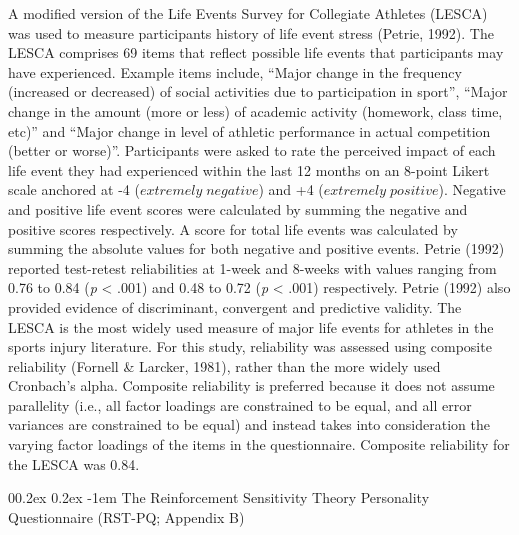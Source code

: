 \documentclass[
  english,
  man,floatsintext]{apa6}
\makeatletter
\renewcommand{\paragraph}{\@startsection{paragraph}{4}{\parindent}%
  {0\baselineskip \@plus 0.2ex \@minus 0.2ex}%
  {-1em}%
  {\normalfont\normalsize\bfseries\itshape\typesectitle}}
\makeatother
\begin{document}
A modified version of the Life Events Survey for Collegiate Athletes (LESCA) was used to measure participants history of life event stress (Petrie, 1992).
The LESCA comprises 69 items that reflect possible life events that participants may have experienced.
Example items include, \enquote{Major change in the frequency (increased or decreased) of social activities due to participation in sport}, \enquote{Major change in the amount (more or less) of academic activity (homework, class time, etc)} and \enquote{Major change in level of athletic performance in actual competition (better or worse)}.
Participants were asked to rate the perceived impact of each life event they had experienced within the last 12 months on an 8-point Likert scale anchored at -4 (\(extremely\;negative\)) and +4 (\(extremely\;positive\)).
Negative and positive life event scores were calculated by summing the negative and positive scores respectively.
A score for total life events was calculated by summing the absolute values for both negative and positive events.
Petrie (1992) reported test-retest reliabilities at 1-week and 8-weeks with values ranging from 0.76 to 0.84 (\emph{p} \textless{} .001) and 0.48 to 0.72 (\emph{p} \textless{} .001) respectively.
Petrie (1992) also provided evidence of discriminant, convergent and predictive validity.
The LESCA is the most widely used measure of major life events for athletes in the sports injury literature.
For this study, reliability was assessed using composite reliability (Fornell \& Larcker, 1981), rather than the more widely used Cronbach's alpha.
Composite reliability is preferred because it does not assume parallelity (i.e., all factor loadings are constrained to be equal, and all error variances are constrained to be equal) and instead takes into consideration the varying factor loadings of the items in the questionnaire.
Composite reliability for the LESCA was 0.84.

\hypertarget{the-reinforcement-sensitivity-theory-personality-questionnaire-rst-pq-appendix-b}{%
\paragraph{The Reinforcement Sensitivity Theory Personality Questionnaire (RST-PQ; Appendix B)}\label{the-reinforcement-sensitivity-theory-personality-questionnaire-rst-pq-appendix-b}}
\end{document}
